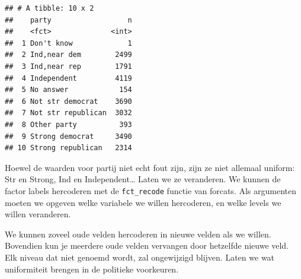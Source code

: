 \documentclass[]{tufte-book}
\newenvironment{Shaded}{}{}
\newcommand{\ErrorTok}[1]{\textcolor[rgb]{1.00,0.00,0.00}{\textbf{#1}}}
\newcommand{\KeywordTok}[1]{\textcolor[rgb]{0.00,0.44,0.13}{\textbf{#1}}}
\newcommand{\NormalTok}[1]{#1}
\newcommand{\OperatorTok}[1]{\textcolor[rgb]{0.40,0.40,0.40}{#1}}
\newcommand{\StringTok}[1]{\textcolor[rgb]{0.25,0.44,0.63}{#1}}
\begin{document}
\begin{Shaded}
\end{Shaded}

\begin{verbatim}
## # A tibble: 10 x 2
##    party                  n
##    <fct>              <int>
##  1 Don't know             1
##  2 Ind,near dem        2499
##  3 Ind,near rep        1791
##  4 Independent         4119
##  5 No answer            154
##  6 Not str democrat    3690
##  7 Not str republican  3032
##  8 Other party          393
##  9 Strong democrat     3490
## 10 Strong republican   2314
\end{verbatim}

Hoewel de waarden voor partij niet echt fout zijn, zijn ze niet allemaal uniform: Str en Strong, Ind en Independent\ldots{} Laten we ze veranderen. We kunnen de factor labels hercoderen met de \texttt{fct\_recode} functie van forcats. Als argumenten moeten we opgeven welke variabele we willen hercoderen, en welke levels we willen veranderen.

\begin{Shaded}
\end{Shaded}

We kunnen zoveel oude velden hercoderen in nieuwe velden als we willen. Bovendien kun je meerdere oude velden vervangen door hetzelfde nieuwe veld. Elk niveau dat niet genoemd wordt, zal ongewijzigd blijven. Laten we wat uniformiteit brengen in de politieke voorkeuren.
\end{document}
